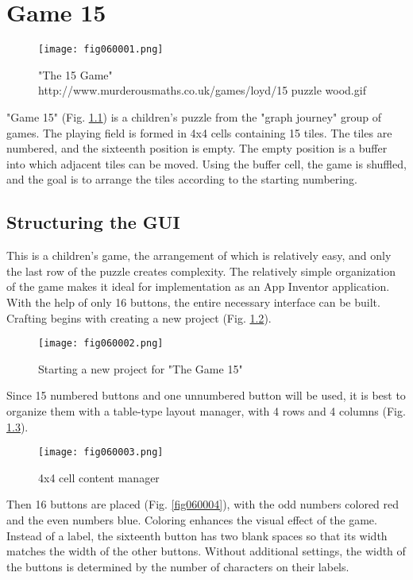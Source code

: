 \chapter{Game 15}

\begin{figure}[H]
   \centering
   \texttt{[image: fig060001.png]}
   \caption{"The 15 Game" \\ http://www.murderousmaths.co.uk/games/loyd/15 puzzle wood.gif}
\label{fig060001}
\end{figure}

"Game 15" (Fig. \ref{fig060001}) is a children's puzzle from the "graph journey" group of games. The playing field is formed in 4x4 cells containing 15 tiles. The tiles are numbered, and the sixteenth position is empty. The empty position is a buffer into which adjacent tiles can be moved. Using the buffer cell, the game is shuffled, and the goal is to arrange the tiles according to the starting numbering.

\section{Structuring the GUI}

This is a children's game, the arrangement of which is relatively easy, and only the last row of the puzzle creates complexity. The relatively simple organization of the game makes it ideal for implementation as an App Inventor application. With the help of only 16 buttons, the entire necessary interface can be built. Crafting begins with creating a new project (Fig. \ref{fig060002}).

\begin{figure}[H]
   \centering
   \texttt{[image: fig060002.png]}
   \caption{Starting a new project for "The Game 15"}
\label{fig060002}
\end{figure}

Since 15 numbered buttons and one unnumbered button will be used, it is best to organize them with a table-type layout manager, with 4 rows and 4 columns (Fig. \ref{fig060003}).

\begin{figure}[H]
   \centering
   \texttt{[image: fig060003.png]}
   \caption{4x4 cell content manager}
\label{fig060003}
\end{figure}

Then 16 buttons are placed (Fig. \ref{fig060004}), with the odd numbers colored red and the even numbers blue. Coloring enhances the visual effect of the game. Instead of a label, the sixteenth button has two blank spaces so that its width matches the width of the other buttons. Without additional settings, the width of the buttons is determined by the number of characters on their labels.

